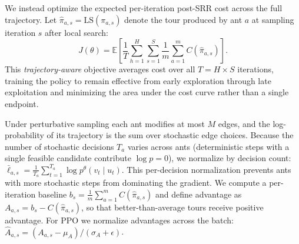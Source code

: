\documentclass[sigconf,review]{acmart}
\begin{document}
We instead optimize the expected per-iteration post-SRR cost across the full trajectory.
Let $\hat{\pi}_{a,s} = \mathrm{LS}(\pi_{a,s})$ denote the tour produced by ant $a$ at sampling iteration $s$ after local search:
\begin{equation}
J(\theta) = \mathbb{E} \left[ \frac{1}{T} \sum_{h=1}^H \sum_{s=1}^S \frac{1}{m} \sum_{a=1}^m C(\hat{\pi}_{a,s}) \right].
\end{equation}
This \emph{trajectory-aware} objective averages cost over all $T = H \times S$ iterations, training the policy to remain effective from early exploration through late exploitation and minimizing the area under the cost curve rather than a single endpoint.

Under perturbative sampling each ant modifies at most $M$ edges, and the log-probability of its trajectory is the sum over stochastic edge choices.
Because the number of stochastic decisions $T_a$ varies across ants (deterministic steps with a single feasible candidate contribute $\log p = 0$), we normalize by decision count: $\bar{\ell}_{a,s} = \frac{1}{T_a} \sum_{t=1}^{T_a} \log p^\theta(v_t \mid u_t)$.
This per-decision normalization prevents ants with more stochastic steps from dominating the gradient.
We compute a per-iteration baseline $b_s = \frac{1}{m}\sum_{a=1}^{m} C(\hat{\pi}_{a,s})$ and define advantage as $A_{a,s} = b_s - C(\hat{\pi}_{a,s})$, so that better-than-average tours receive positive advantage.
For PPO we normalize advantages across the batch: $\hat{A}_{a,s} = (A_{a,s} - \mu_A) / (\sigma_A + \epsilon)$.
\end{document}
